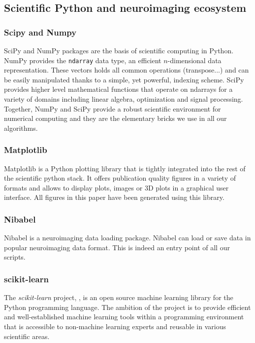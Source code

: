 \documentclass{frontiersSCNS} %
\begin{document}
\subsection{Scientific Python and neuroimaging ecosystem}

\subsubsection{Scipy and Numpy}

SciPy and NumPy packages are the basis of scientific computing in Python.
NumPy provides the \verb!ndarray! data type, an efficient $n$-dimensional data
representation. These vectors holds all common operations (transpose...) and
can be easily manipulated thanks to a simple, yet powerful, indexing scheme.
SciPy provides higher level mathematical functions that operate on ndarrays for
a variety of domains including linear algebra, optimization and signal
processing. Together, NumPy and SciPy provide a robust scientific environment
for numerical computing and they are the elementary bricks we use in all our
algorithms.

\subsubsection{Matplotlib}

Matplotlib is a Python plotting library that is tightly integrated into the
rest of the scientific python stack. It offers publication quality figures in
a variety of formats and allows to display plots, images or 3D plots in a
graphical user interface. All figures in this paper have been generated using
this library.


\subsubsection{Nibabel}

Nibabel is a neuroimaging data loading package. Nibabel can load or save data in
popular neuroimaging data format. This is indeed an entry point of all
our scripts.

\subsubsection{scikit-learn}

The {\em scikit-learn} project, \cite{pedregosa2011}, is an open source machine
learning library for the Python programming language. The ambition of the
project is to provide efficient and well-established machine learning tools within
a programming environment that is accessible to non-machine learning experts
and reusable in various scientific areas.
\end{document}
